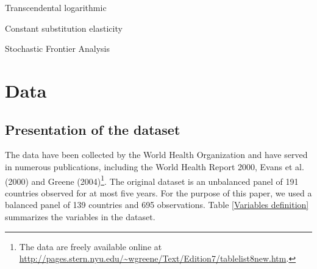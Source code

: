 \documentclass[12pt,a4paper]{article}\usepackage[]{graphicx}\usepackage[]{color}
\begin{document}
Transcendental logarithmic 

Constant substitution elasticity

Stochastic Frontier Analysis



\section{Data}




\subsection{Presentation of the dataset}
The data have been collected by the World Health Organization and have served in numerous publications, including the World Health Report 2000, Evans et al. (2000) and Greene (2004)\footnote{The data are freely available online at \\ \url{http://pages.stern.nyu.edu/~wgreene/Text/Edition7/tablelist8new.htm}.}. The original dataset is an unbalanced panel of 191 countries observed for at most five years. For the purpose of this paper, we used a balanced panel of 139 countries and 695 observations. Table \ref{Variables definition} summarizes the variables in the dataset.
\end{document}
